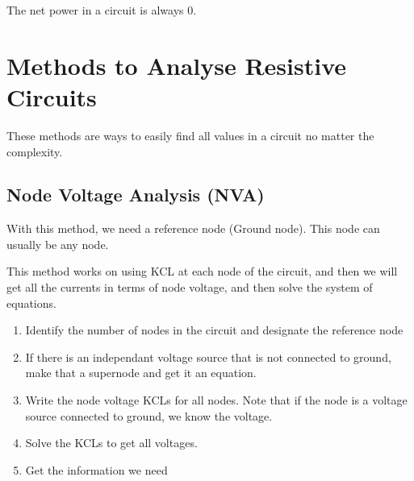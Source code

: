 \documentclass[12pt,letterpaper]{article} \usepackage{amsmath} \usepackage{graphicx} \usepackage[margin=1in]{geometry} \usepackage{longtable}  \usepackage{amssymb}
\begin{document}
	The net power in a circuit is always 0.
	
	\section{Methods to Analyse Resistive Circuits}
	These methods are ways to easily find all values in a circuit no matter the complexity. 
	
	\subsection{Node Voltage Analysis (NVA)}
	With this method, we need a reference node (Ground node). This node can usually be any node.
	
	This method works on using KCL at each node of the circuit, and then we will get all the currents in terms of node voltage, and then solve the system of equations. 
	\begin{enumerate}[noitemsep]
		\item Identify the number of nodes in the circuit and designate the reference node
		\item If there is an independant voltage source that is not connected to ground, make that a supernode and get it an equation. 
		\item Write the node voltage KCLs for all nodes. Note that if the node is a voltage source connected to ground, we know the voltage. 
		\item Solve the KCLs to get all voltages.
		\item Get the information we need
	\end{enumerate}
\end{document}
